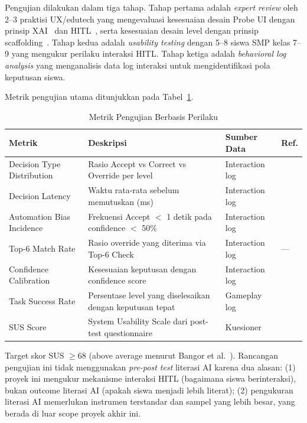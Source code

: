 \documentclass[12pt,a4paper,oneside,openany]{report}
\begin{document}
Pengujian dilakukan dalam tiga tahap. Tahap pertama adalah \textit{expert review} oleh 2--3 praktisi UX/edutech yang mengevaluasi kesesuaian desain Probe UI dengan prinsip XAI~\cite{ref3} dan HITL~\cite{ref4}, serta kesesuaian desain level dengan prinsip scaffolding~\cite{ref6}\cite{ref7}. Tahap kedua adalah \textit{usability testing} dengan 5--8 siswa SMP kelas 7--9 yang mengukur perilaku interaksi HITL. Tahap ketiga adalah \textit{behavioral log analysis} yang menganalisis data log interaksi untuk mengidentifikasi pola keputusan siswa.

Metrik pengujian utama ditunjukkan pada Tabel~\ref{tab:metrik-pengujian}.

\begin{table}[H]
\centering
\caption{Metrik Pengujian Berbasis Perilaku}
\label{tab:metrik-pengujian}
\begin{tabular}{|p{3.5cm}|p{4.5cm}|p{3cm}|p{1.8cm}|}
\hline
\textbf{Metrik} & \textbf{Deskripsi} & \textbf{Sumber Data} & \textbf{Ref.} \\ \hline
Decision Type Distribution & Rasio Accept vs Correct vs Override per level & Interaction log & \cite{ref4}\cite{ref5} \\ \hline
Decision Latency & Waktu rata-rata sebelum memutuskan (ms) & Interaction log & \cite{ref4} \\ \hline
Automation Bias Incidence & Frekuensi Accept $<$ 1 detik pada confidence $<$ 50\% & Interaction log & \cite{ref4} \\ \hline
Top-6 Match Rate & Rasio override yang diterima via Top-6 Check & Interaction log & --- \\ \hline
Confidence Calibration & Kesesuaian keputusan dengan confidence score & Interaction log & \cite{ref9} \\ \hline
Task Success Rate & Persentase level yang diselesaikan dengan keputusan tepat & Gameplay log & \cite{ref6} \\ \hline
SUS Score & System Usability Scale dari post-test questionnaire & Kuesioner & \cite{ref15}\cite{ref16} \\ \hline
\end{tabular}
\end{table}

Target skor SUS $\geq 68$ (above average menurut Bangor et al.~\cite{ref16}). Rancangan pengujian ini tidak menggunakan \textit{pre-post test} literasi AI karena dua alasan: (1) proyek ini mengukur mekanisme interaksi HITL (bagaimana siswa berinteraksi), bukan outcome literasi AI (apakah siswa menjadi lebih literat); (2) pengukuran literasi AI memerlukan instrumen terstandar dan sampel yang lebih besar, yang berada di luar scope proyek akhir ini.
\end{document}
